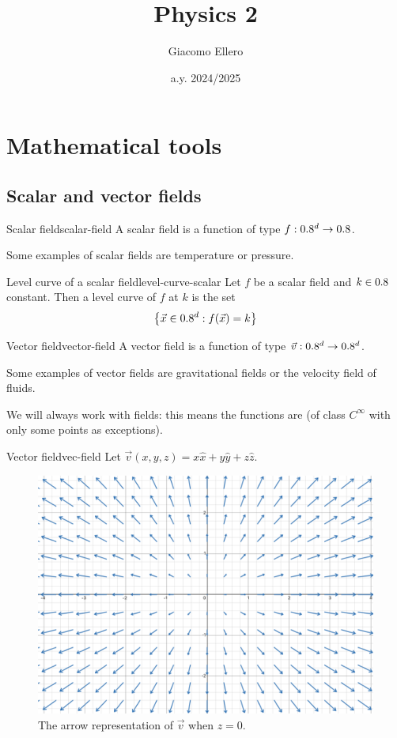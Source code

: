 \documentclass[12pt]{extarticle}
\title{Physics 2}
\author{Giacomo Ellero}
\date{a.y. 2024/2025}
\begin{document}
\firstpage

\section{Mathematical tools}

\subsection{Scalar and vector fields}

\begin{definition}{Scalar field}{scalar-field}
	A scalar field is a function of type $f:0.8^d \to 0.8$.
\end{definition}

Some examples of scalar fields are temperature or pressure.

\begin{definition}{Level curve of a scalar field}{level-curve-scalar}
	Let $f$ be a scalar field and $k \in 0.8$ constant.
	Then a level curve of $f$ at $k$ is the set
	\begin{equation}
		\left\{ \vec x \in 0.8^d : f(\vec x) = k  \right\}
	\end{equation}
\end{definition}


\begin{definition}{Vector field}{vector-field}
	A vector field is a function of type $\vec v: 0.8^d \to 0.8^d$.
\end{definition}

Some examples of vector fields are gravitational fields or the velocity field of fluids.

We will always work with  fields: this means the functions are  (of class $C^\infty$ with only some points as exceptions).

\begin{example}{Vector field}{vec-field}
	Let $\vec v(x, y, z) = x \hat x + y \hat y + z \hat z$.

	\begin{figure}[H]
		\centering
		\includegraphics[height=0.4\textwidth]{assets/physics-2/vector-field-example.png}
		\caption{The arrow representation of $\vec v$ when $z = 0$.}
		\label{fig:field_source_0}
	\end{figure}
\end{example}
\end{document}
